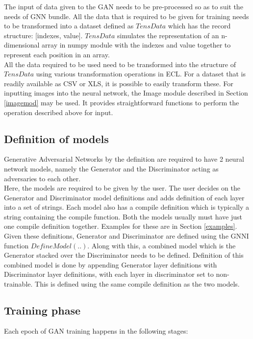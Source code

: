 \documentclass[conference]{IEEEtran}
\begin{document}
The input of data given to the GAN needs to be pre-processed so as to suit the needs of GNN bundle. All the data that is required to be given for training needs to be transformed into a dataset defined as $TensData$ which has the record structure: [indexes, value]. $TensData$ simulates the representation of an n-dimensional array in numpy module with the indexes and value together to represent each position in an array. 
\\
All the data required to be used need to be transformed into the structure of $TensData$ using various transformation operations in ECL. For a dataset that is readily available as CSV or XLS, it is possible to easily transform these. For inputting images into the neural network, the Image module described in Section \ref{imagemod} may be used. It provides straightforward functions to perform the operation described above for input.  

\subsection{Definition of models}

Generative Adversarial Networks by the definition are required to have 2 neural network models, namely the Generator and the Discriminator acting as adversaries to each other. 
\\
Here, the models are required to be given by the user. The user decides on the Generator and Discriminator model definitions and adds definition of each layer into a set of strings. Each model also has a compile definition which is typically a string containing the compile function. Both the models usually must have just one compile definition together. Examples for these are in Section \ref{examples}.
\\
Given these definitions, Generator and Discriminator are defined using the GNNI function $DefineModel(..)$. Along with this, a combined model which is the Generator stacked over the Discriminator needs to be defined. Definition of this combined model is done by appending Generator layer definitions with Discriminator layer definitions, with each layer in discriminator set to non-trainable. This is defined using the same compile definition as the two models. 

\subsection{Training phase}

Each epoch of GAN training happens in the following stages:
\end{document}
